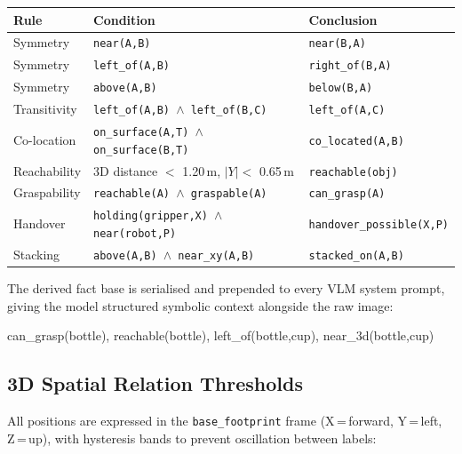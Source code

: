 \begin{center}
\small
\begin{tabularx}{\linewidth}{lXl}
\toprule
\textbf{Rule} & \textbf{Condition} & \textbf{Conclusion} \\
\midrule
Symmetry      & \texttt{near(A,B)}                                    & \texttt{near(B,A)} \\
Symmetry      & \texttt{left\_of(A,B)}                                & \texttt{right\_of(B,A)} \\
Symmetry      & \texttt{above(A,B)}                                   & \texttt{below(B,A)} \\
Transitivity  & \texttt{left\_of(A,B) $\wedge$ left\_of(B,C)}        & \texttt{left\_of(A,C)} \\
Co-location   & \texttt{on\_surface(A,T) $\wedge$ on\_surface(B,T)}  & \texttt{co\_located(A,B)} \\
Reachability  & 3D distance $<$ 1.20\,m, $|Y|<$ 0.65\,m             & \texttt{reachable(obj)} \\
Graspability  & \texttt{reachable(A) $\wedge$ graspable(A)}          & \texttt{can\_grasp(A)} \\
Handover      & \texttt{holding(gripper,X) $\wedge$ near(robot,P)}   & \texttt{handover\_possible(X,P)} \\
Stacking      & \texttt{above(A,B) $\wedge$ near\_xy(A,B)}           & \texttt{stacked\_on(A,B)} \\
\bottomrule
\end{tabularx}
\end{center}

The derived fact base is serialised and prepended to every VLM system prompt,
giving the model structured symbolic context alongside the raw image:
\begin{center}
\small\ttfamily
can\_grasp(bottle), reachable(bottle), left\_of(bottle,cup), near\_3d(bottle,cup)
\end{center}

\subsection{3D Spatial Relation Thresholds}

All positions are expressed in the \texttt{base\_footprint} frame
(X\,=\,forward, Y\,=\,left, Z\,=\,up), with hysteresis bands to prevent
oscillation between labels:

